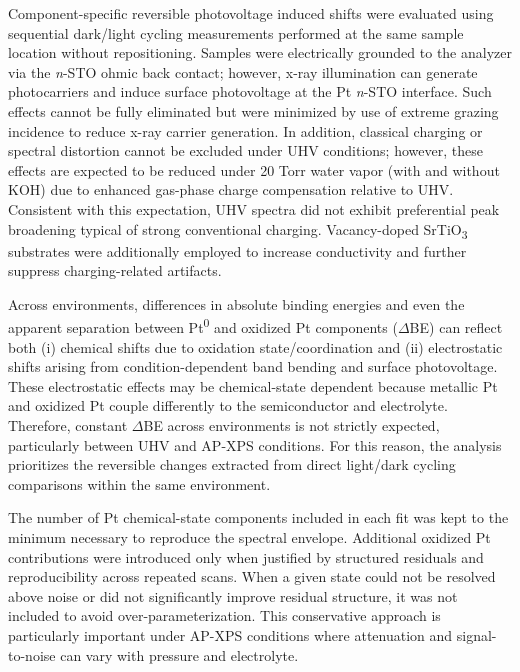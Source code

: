 \documentclass[11pt]{article}
\begin{document}
Component-specific reversible photovoltage induced shifts were evaluated
using sequential dark/light cycling measurements performed at the same
sample location without repositioning. Samples were electrically
grounded to the analyzer via the \emph{n}-STO ohmic back contact;
however, x-ray illumination can generate photocarriers and induce
surface photovoltage at the Pt \textbar{} \emph{n}-STO
interface\cite{teeter2019}. Such effects cannot be fully eliminated
but were minimized by use of extreme grazing incidence to reduce x-ray
carrier generation. In addition, classical charging or spectral
distortion cannot be excluded under UHV conditions; however, these
effects are expected to be reduced under 20 Torr water vapor (with and
without KOH) due to enhanced gas-phase charge compensation relative to
UHV. Consistent with this expectation, UHV spectra did not exhibit
preferential peak broadening typical of strong conventional charging.
Vacancy-doped SrTiO\textsubscript{3} substrates were additionally employed to increase
conductivity and further suppress charging-related artifacts.

Across environments, differences in absolute binding energies and even
the apparent separation between Pt\textsuperscript{0} and oxidized Pt components ($\Delta$BE) can
reflect both (i) chemical shifts due to oxidation state/coordination and
(ii) electrostatic shifts arising from condition-dependent band bending
and surface photovoltage. These electrostatic effects may be
chemical-state dependent because metallic Pt and oxidized Pt couple
differently to the semiconductor and electrolyte. Therefore, constant
$\Delta$BE across environments is not strictly expected, particularly between
UHV and AP-XPS conditions. For this reason, the analysis prioritizes the
reversible changes extracted from direct light/dark cycling comparisons
within the same environment.

The number of Pt chemical-state components included in each fit was kept
to the minimum necessary to reproduce the spectral envelope. Additional
oxidized Pt contributions were introduced only when justified by
structured residuals and reproducibility across repeated scans. When a
given state could not be resolved above noise or did not significantly
improve residual structure, it was not included to avoid
over-parameterization. This conservative approach is particularly
important under AP-XPS conditions where attenuation and signal-to-noise
can vary with pressure and electrolyte.
\end{document}
